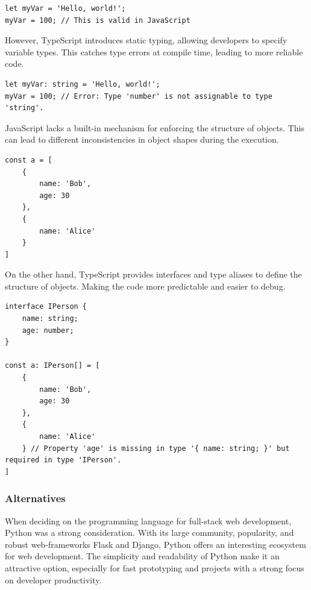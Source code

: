 \medskip
\begin{lstlisting}[caption=JavaScript dynamic typing example]
let myVar = 'Hello, world!';
myVar = 100; // This is valid in JavaScript
\end{lstlisting}

However, TypeScript introduces static typing, allowing developers to specify variable types. This catches type errors at compile time, leading to more reliable code.
\medskip
\begin{lstlisting}[caption=TypeScript static typing example]
let myVar: string = 'Hello, world!';
myVar = 100; // Error: Type 'number' is not assignable to type 'string'.
\end{lstlisting}

JavaScript lacks a built-in mechanism for enforcing the structure of objects. This can lead to different inconsistencies in object shapes during the execution.

\medskip
\begin{lstlisting}[caption=JavaScript different object shapes]
const a = [
    { 
        name: 'Bob', 
        age: 30 
    }, 
    { 
        name: 'Alice' 
    }
]
\end{lstlisting}

On the other hand, TypeScript provides interfaces and type aliases to define the structure of objects.
Making the code more predictable and easier to debug.

\medskip
\begin{lstlisting}[caption=TypeScript enforcing object shape]
interface IPerson {
    name: string;
    age: number;
}

const a: IPerson[] = [
    { 
        name: 'Bob', 
        age: 30 
    }, 
    { 
        name: 'Alice' 
    } // Property 'age' is missing in type '{ name: string; }' but required in type 'IPerson'.
]
\end{lstlisting}


\subsubsection{Alternatives}
When deciding on the programming language for full-stack web development, Python was a strong consideration.
With its large community, popularity, and robust web-frameworks Flask and Django, Python offers an interesting ecosystem for web development.
The simplicity and readability of Python make it an attractive option, especially for fast prototyping and projects with a strong focus on developer productivity.

